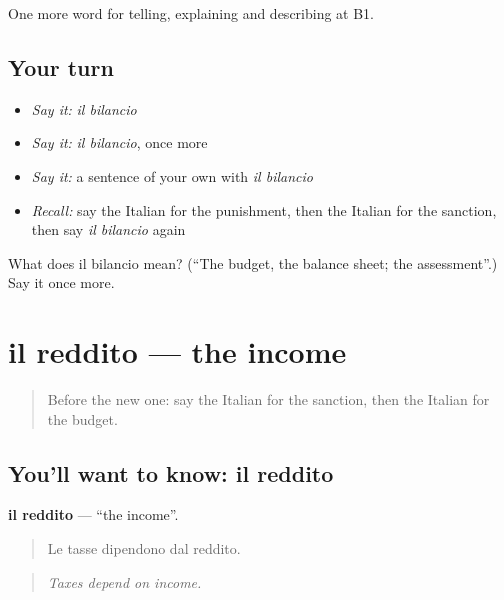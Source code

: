 \begin{grammarlens}[title={What you've built}]
One more word for telling, explaining and describing at B1.
\end{grammarlens}

\subsection*{Your turn}
\begin{itemize}
\raggedright
  \item \emph{Say it:} \emph{il bilancio}
  \item \emph{Say it:} \emph{il bilancio}, once more
  \item \emph{Say it:} a sentence of your own with \emph{il bilancio}
  \item \emph{Recall:} say the Italian for the punishment, then the Italian for the sanction, then say \emph{il bilancio} again
\end{itemize}

\begin{tcolorbox}[breakable,colback=teal!4,colframe=teal!35!black,title={Before you move on}]
What does il bilancio mean? (\textquotedblleft{}The budget, the balance sheet; the assessment\textquotedblright{}.) Say it once more.
\end{tcolorbox}
\section[il reddito]{il reddito — the income}

\label{lesson:IT-C394-reddito}



\begin{quote}
Before the new one: say the Italian for the sanction, then the Italian for the budget.
\end{quote}

\subsection*{You'll want to know: il reddito}
\textbf{il reddito} — \textquotedblleft{}the income\textquotedblright{}.

\begin{quote}
Le tasse dipendono dal reddito.
\end{quote}

\begin{quote}
\emph{Taxes depend on income.}
\end{quote}

